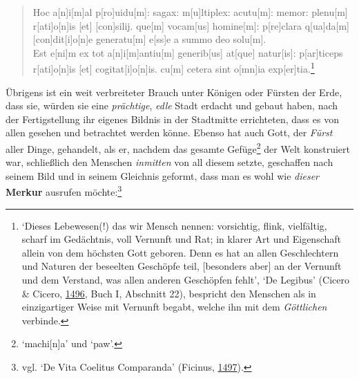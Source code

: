 \documentclass[
]{article}
\begin{document}
\begin{quote}
Hoc a{[}n{]}i{[}m{]}al p{[}ro{]}uidu{[}m{]}: sagax: m{[}u{]}ltiplex:
acutu{[}m{]}: memor: plenu{[}m{]} r{[}ati{]}o{[}n{]}is {[}et{]}
{[}con{]}silij. que{[}m{]} vocam{[}us{]} homine{[}m{]}: p{[}re{]}clara
q{[}ua{]}da{[}m{]} {[}con{]}dit{[}i{]}o{[}n{]}e generatu{[}m{]}
e{[}ss{]}e a summo deo solu{[}m{]}.\\
Est e{[}ni{]}m ex tot a{[}n{]}i{[}m{]}antiu{[}m{]} generib{[}us{]}
at{[}que{]} natur{[}is{]}: p{[}ar{]}ticeps r{[}ati{]}o{[}n{]}is {[}et{]}
cogitat{[}i{]}o{[}n{]}is. cu{[}m{]} cetera sint o{[}mn{]}ia
exp{[}er{]}tia.\footnote{`Dieses Lebewesen(!) das wir Mensch nennen:
  vorsichtig, flink, vielfältig, scharf im Gedächtnis, voll Vernunft und
  Rat; in klarer Art und Eigenschaft allein von dem höchsten Gott
  geboren. Denn es hat an allen Geschlechtern und Naturen der beseelten
  Geschöpfe teil, {[}besonders aber{]} an der Vernunft und dem Verstand,
  was allen anderen Geschöpfen fehlt', `De Legibus' (Cicero \& Cicero,
  \href{https://doi.org/10.3931/e-rara-89116}{1496}, Buch I, Abschnitt
  22), bespricht den Menschen als in einzigartiger Weise mit Vernunft
  begabt, welche ihn mit dem \emph{Göttlichen} verbinde.}
\end{quote}

Übrigens ist ein weit verbreiteter Brauch unter Königen oder Fürsten der
Erde, dass sie, würden sie eine \emph{prächtige}, \emph{edle} Stadt
erdacht und gebaut haben, nach der Fertigstellung ihr eigenes Bildnis in
der Stadtmitte errichteten, dass es von allen gesehen und betrachtet
werden könne. Ebenso hat auch Gott, der \emph{Fürst} aller Dinge,
gehandelt, als er, nachdem das gesamte Gefüge\footnote{`machi{[}n{]}a'
  und `paw'.} der Welt konstruiert war, schließlich den Menschen
\emph{inmitten} von all diesem setzte, geschaffen nach seinem Bild und
in seinem Gleichnis geformt, dass man es wohl wie \emph{dieser}
\textbf{Merkur} ausrufen möchte:\footnote{vgl. `De Vita Coelitus
  Comparanda' (Ficinus,
  \href{https://doi.org/10.3931/e-rara-68641}{1497}).}
\end{document}
